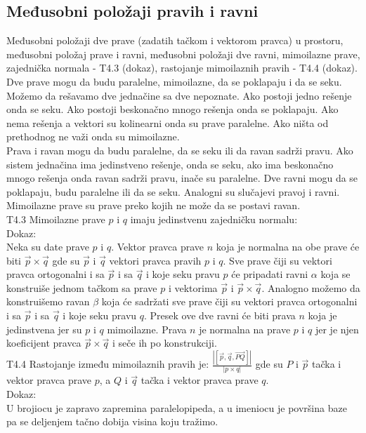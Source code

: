 \documentclass[12pt]{article}
\newcommand{\vek}[1]{\overrightarrow{#1}}
\begin{document}
\subsection{Međusobni položaji pravih i ravni}
\label{subsec:pitanje_16}
Međusobni položaji dve prave (zadatih tačkom i vektorom
pravca) u prostoru, međusobni položaj prave i ravni,
međusobni položaji dve ravni, mimoilazne prave, zajednička
normala - T4.3 (dokaz), rastojanje mimoilaznih pravih -
T4.4 (dokaz).
\\[1cm]
Dve prave mogu da budu paralelne, mimoilazne,
da se poklapaju i da se seku. Možemo da rešavamo
dve jednačine sa dve nepoznate. Ako postoji
jedno rešenje onda se seku. Ako postoji beskonačno
mnogo rešenja onda se poklapaju. Ako nema rešenja
a vektori su kolinearni onda su prave paralelne.
Ako ništa od prethodnog ne važi onda su mimoilazne.\\
Prava i ravan mogu da budu paralelne, da se seku
ili da ravan sadrži pravu. Ako sistem jednačina
ima jedinstveno rešenje, onda se seku, ako ima
beskonačno mnogo rešenja onda ravan sadrži pravu,
inače su paralelne.
Dve ravni mogu da se poklapaju, budu paralelne ili da se seku.
Analogni su slučajevi pravoj i ravni.\\
Mimoilazne prave su prave preko kojih ne može da se
postavi ravan.\\
T4.3 Mimoilazne prave $p$ i $q$ imaju jedinstvenu
zajedničku normalu:\\
Dokaz:\\
Neka su date prave $p$ i $q$. Vektor pravca
prave $n$ koja je normalna na obe prave će
biti $\vek{p}\times\vek{q}$ gde su
$\vek{p}$ i $\vek{q}$ vektori
pravca pravih $p$ i $q$. Sve prave čiji su
vektori pravca ortogonalni
i sa $\vek{p}$ i sa $\vek{q}$
i koje seku pravu $p$ će
pripadati ravni $\alpha$ koja se konstruiše
jednom tačkom sa prave $p$ i vektorima $\vek{p}$
i $\vek{p}\times\vek{q}$.
Analogno možemo da konstruišemo ravan $\beta$
koja će sadržati sve prave čiji su
vektori pravca ortogonalni
i sa $\vek{p}$ i sa $\vek{q}$
i koje seku pravu $q$. Presek ove dve ravni
će biti prava $n$ koja je jedinstvena jer
su $p$ i $q$ mimoilazne. Prava $n$ je normalna
na prave $p$ i $q$ jer je njen koeficijent pravca
$\vek{p}\times \vek{q}$ i seče
ih po konstrukciji.\\
T4.4 Rastojanje između mimoilaznih pravih je:
$\frac{|[\vek{p},\vek{q},\vek{PQ}]|}{|p\times q|}$ gde su
$P$ i $\vek{p}$ tačka i vektor pravca prave $p$,
a $Q$ i $\vek{q}$ tačka i vektor pravca prave $q$.\\
Dokaz:\\
U brojiocu je zapravo zapremina paralelopipeda, a u
imeniocu je površina baze pa se deljenjem tačno dobija
visina koju tražimo.
\end{document}
